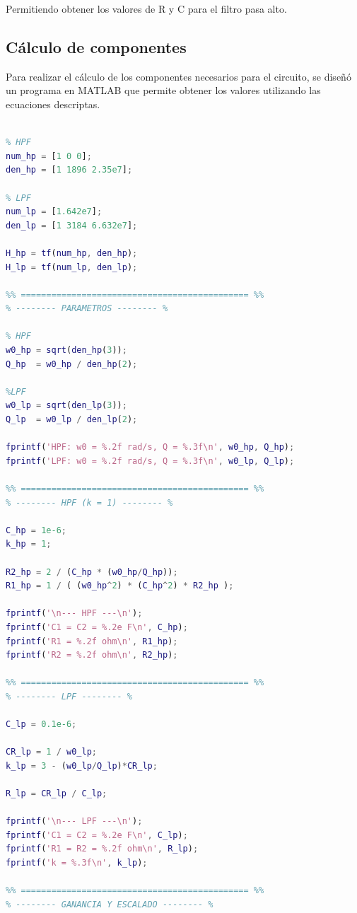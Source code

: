 \documentclass[12pt,a4paper]{article}
\begin{document}
Permitiendo obtener los valores de R y C para el filtro pasa alto.

\subsection{Cálculo de componentes}

Para realizar el cálculo de los componentes necesarios para el circuito, se diseñó un programa en MATLAB que permite obtener los valores utilizando las ecuaciones descriptas.

\begin{lstlisting}[language=Matlab]
% -------- Funciones de transferencia objetivo -------- %

% HPF
num_hp = [1 0 0];
den_hp = [1 1896 2.35e7];

% LPF
num_lp = [1.642e7];
den_lp = [1 3184 6.632e7];

H_hp = tf(num_hp, den_hp);
H_lp = tf(num_lp, den_lp);

%% ============================================= %%
% -------- PARAMETROS -------- %

% HPF
w0_hp = sqrt(den_hp(3));
Q_hp  = w0_hp / den_hp(2);

%LPF
w0_lp = sqrt(den_lp(3));
Q_lp  = w0_lp / den_lp(2);

fprintf('HPF: w0 = %.2f rad/s, Q = %.3f\n', w0_hp, Q_hp);
fprintf('LPF: w0 = %.2f rad/s, Q = %.3f\n', w0_lp, Q_lp);

%% ============================================= %%
% -------- HPF (k = 1) -------- %

C_hp = 1e-6;
k_hp = 1;

R2_hp = 2 / (C_hp * (w0_hp/Q_hp));
R1_hp = 1 / ( (w0_hp^2) * (C_hp^2) * R2_hp );

fprintf('\n--- HPF ---\n');
fprintf('C1 = C2 = %.2e F\n', C_hp);
fprintf('R1 = %.2f ohm\n', R1_hp);
fprintf('R2 = %.2f ohm\n', R2_hp);

%% ============================================= %%
% -------- LPF -------- %

C_lp = 0.1e-6;

CR_lp = 1 / w0_lp;
k_lp = 3 - (w0_lp/Q_lp)*CR_lp;

R_lp = CR_lp / C_lp;

fprintf('\n--- LPF ---\n');
fprintf('C1 = C2 = %.2e F\n', C_lp);
fprintf('R1 = R2 = %.2f ohm\n', R_lp);
fprintf('k = %.3f\n', k_lp);

%% ============================================= %%
% -------- GANANCIA Y ESCALADO -------- %


\end{lstlisting}
\end{document}
